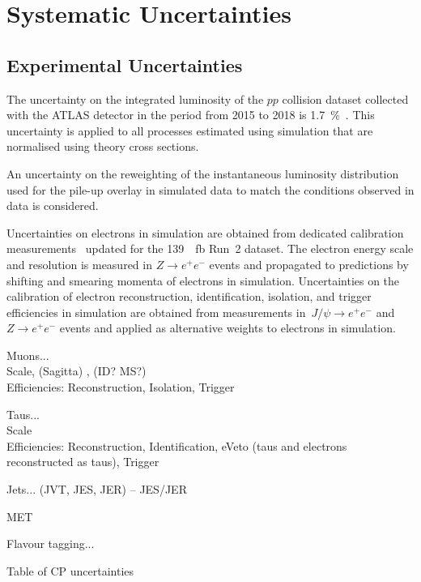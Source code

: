 \section{Systematic Uncertainties}
\label{sec:uncertainties}

\subsection{Experimental Uncertainties}


The uncertainty on the integrated luminosity of the $pp$ collision
dataset collected with the ATLAS detector in the period from 2015 to
2018 is \SI{1.7}{\percent}~\cite{ATLAS-CONF-2019-021}. This
uncertainty is applied to all processes estimated using simulation
that are normalised using theory cross sections.

An uncertainty on the reweighting of the instantaneous luminosity
distribution used for the pile-up overlay in simulated data to match
the conditions observed in data is considered.

Uncertainties on electrons in simulation are obtained from dedicated
calibration measurements~\cite{EGAM-2018-01,TRIG-2018-05} updated for
the \SI{139}{\per\femto\barn} Run~2 dataset. The electron energy scale
and resolution is measured in $Z \to e^+e^-$ events and propagated to
predictions by shifting and smearing momenta of electrons in
simulation. Uncertainties on the calibration of electron
reconstruction, identification, isolation, and trigger efficiencies in
simulation are obtained from measurements in~$J/\psi \to e^+e^-$ and
$Z \to e^+e^-$ events and applied as alternative weights to electrons
in simulation.

Muons... \cite{MUON-2018-03} \\
Scale, (Sagitta) , (ID? MS?) \\
Efficiencies: Reconstruction, Isolation, Trigger

Taus... \\
Scale \\
Efficiencies: Reconstruction, Identification, eVeto (taus and
electrons reconstructed as taus), Trigger

Jets... (JVT, JES, JER) -- JES/JER \cite{JETM-2018-05}

MET

Flavour tagging... \cite{FTAG-2018-01}

\begin{table}[htbp]
  \centering

  

  \caption{Table of CP uncertainties}
  \label{tab:bla}
\end{table}

